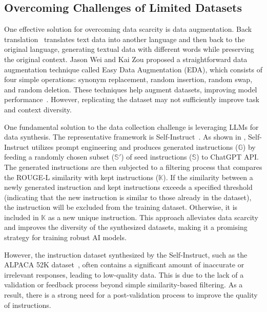 \subsection{Overcoming Challenges of Limited Datasets}
One effective solution for overcoming data scarcity is data augmentation.
Back translation~\cite{backtranslation} translates text data into
another language and then back to the original language, generating textual data
with different words while preserving the original context. Jason Wei and Kai
Zou proposed a straightforward data augmentation technique called
Easy Data Augmentation (EDA), which consists of four simple operations: synonym
replacement, random insertion, random swap, and random deletion. These
techniques help augment datasets, improving model performance~\cite{eda}. However,
replicating the dataset may not sufficiently improve task and context diversity.

One fundamental solution to the data collection challenge is leveraging
LLMs for data synthesis. 
The representative framework is Self-Instruct~\cite{self-instruct}. 
As shown in ,
Self-Instruct utilizes prompt engineering
and produces generated instructions ($\mathbb{G}$) by feeding
a randomly chosen subset ($\mathbb{S}'$) of seed instructions ($\mathbb{S}$) 
to ChatGPT API.
The generated instructions are then subjected
to a filtering process that compares the ROUGE-L similarity
with kept instructions ($\mathbb{K}$).
If the similarity between a newly generated
instruction and kept instructions exceeds
a specified threshold (indicating
that the new instruction is %
similar to those already in the dataset),
the instruction will be excluded from the training dataset.
Otherwise, it is included in $\mathbb{K}$ as a new unique instruction.
This approach %
alleviates data scarcity %
and improves
the diversity of the synthesized datasets, making it a promising strategy for
training robust AI models.

However, the instruction dataset synthesized by the Self-Instruct,
such as the ALPACA 52K dataset~\cite{alpaca}, often contains a significant amount of 
inaccurate or irrelevant responses, leading to low-quality data.
This is due to the lack of a validation or feedback process beyond
simple similarity-based filtering. 
As a result, there is a strong need 
for a post-validation process to improve the quality of instructions.

